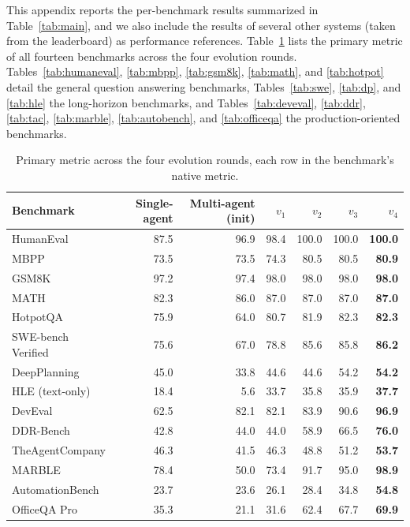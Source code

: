 \documentclass{article} %
\begin{document}
This appendix reports the per-benchmark results summarized in Table~\ref{tab:main}, and we also include the results of several other systems (taken from the leaderboard) as performance references. Table~\ref{tab:evolution_all} lists the primary metric of all fourteen benchmarks across the four evolution rounds. Tables~\ref{tab:humaneval}, \ref{tab:mbpp}, \ref{tab:gsm8k}, \ref{tab:math}, and \ref{tab:hotpot} detail the general question answering benchmarks, Tables~\ref{tab:swe}, \ref{tab:dp}, and \ref{tab:hle} the long-horizon benchmarks, and Tables~\ref{tab:deveval}, \ref{tab:ddr}, \ref{tab:tac}, \ref{tab:marble}, \ref{tab:autobench}, and \ref{tab:officeqa} the production-oriented benchmarks.

\begin{table}[t]
\caption{Primary metric across the four evolution rounds, each row in the benchmark's native metric.}
\label{tab:evolution_all}
\begin{center}
\small
\setlength{\tabcolsep}{3pt}
\begin{tabular}{lrrrrrr}
\toprule
\textbf{Benchmark} & \textbf{Single-agent} & \textbf{Multi-agent (init)} & $v_1$ & $v_2$ & $v_3$ & $v_4$ \\
\midrule
HumanEval & 87.5 & 96.9 & 98.4 & 100.0 & 100.0 & \textbf{100.0} \\
MBPP & 73.5 & 73.5 & 74.3 & 80.5 & 80.5 & \textbf{80.9} \\
GSM8K & 97.2 & 97.4 & 98.0 & 98.0 & 98.0 & \textbf{98.0} \\
MATH & 82.3 & 86.0 & 87.0 & 87.0 & 87.0 & \textbf{87.0} \\
HotpotQA & 75.9 & 64.0 & 80.7 & 81.9 & 82.3 & \textbf{82.3} \\
SWE-bench Verified & 75.6 & 67.0 & 78.8 & 85.6 & 85.8 & \textbf{86.2} \\
DeepPlanning & 45.0 & 33.8 & 44.6 & 44.6 & 54.2 & \textbf{54.2} \\
HLE (text-only) & 18.4 & 5.6 & 33.7 & 35.8 & 35.9 & \textbf{37.7} \\
DevEval & 62.5 & 82.1 & 82.1 & 83.9 & 90.6 & \textbf{96.9} \\
DDR-Bench & 42.8 & 44.0 & 44.0 & 58.9 & 66.5 & \textbf{76.0} \\
TheAgentCompany & 46.3 & 41.5 & 46.3 & 48.8 & 51.2 & \textbf{53.7} \\
MARBLE & 78.4 & 50.0 & 73.4 & 91.7 & 95.0 & \textbf{98.9} \\
AutomationBench & 23.7 & 23.6 & 26.1 & 28.4 & 34.8 & \textbf{54.8} \\
OfficeQA Pro & 35.3 & 21.1 & 31.6 & 62.4 & 67.7 & \textbf{69.9} \\
\bottomrule
\end{tabular}
\end{center}
\end{table}
\end{document}
